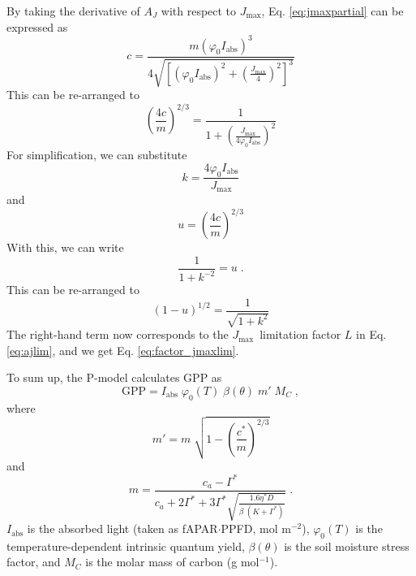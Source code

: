 \documentclass[gmd, manuscript]{copernicus}
\newcommand{\jmax}{$J_{\text{max}}$}
\begin{document}
By taking the derivative of $A_J$ with respect to \jmax , Eq. \ref{eq:jmaxpartial} can be expressed as
\begin{equation}
    c = \frac{ m (\varphi_0 I_\text{abs})^3}{ 4 \sqrt{ \left[ (\varphi_0 I_\text{abs})^2 + (\frac{J_\text{max}}{4})^2 \right]^3 }}
\end{equation}
This can be re-arranged to
\begin{equation}
    \left(\frac{4c}{m}\right)^{2/3} = \frac{1}{1 + \left( \frac{J_\text{max}}{4\varphi_0 I_\text{abs}}\right)^2}
\end{equation}
For simplification, we can substitute 
\begin{equation}
    k = \frac{4 \varphi_0 I_\text{abs}}{J_\text{max}}
\end{equation}
and 
\begin{equation}
    u = \left(\frac{4c}{m}\right)^{2/3}
\end{equation}
With this, we can write
\begin{equation}
    \frac{1}{1+k^{-2}} = u \;.
\end{equation}
This can be re-arranged to 
\begin{equation}
    (1-u)^{1/2} = \frac{1}{\sqrt{1+k^2}} 
\end{equation}
The right-hand term now corresponds to the \jmax\ limitation factor $L$ in Eq. \ref{eq:ajlim}, and we get Eq. \ref{eq:factor_jmaxlim}.

To sum up, the P-model calculates GPP as 
\begin{equation}
  \text{GPP} = I_\text{abs} \; \varphi_0(T) \; \beta(\theta) \; m' \; M_C \;,
\end{equation}
where
\begin{equation}
    m' = m \; \sqrt{1 - \left( \frac{c^\ast}{m} \right)^{2/3} }
\end{equation}
and 
\begin{equation}
    m = \frac{c_a - \Gamma^{\ast}}{c_a + 2 \Gamma^{\ast} + 3 \Gamma^{\ast} \sqrt{\frac{1.6 \eta^{\ast} D }{\beta\;(K+\Gamma^{\ast})}}} \;.
\end{equation}
$I_\text{abs}$ is the absorbed light (taken as fAPAR$\cdot$PPFD, mol m$^{-2}$), $\varphi_0(T)$ is the temperature-dependent intrinsic quantum yield, $\beta(\theta)$ is the soil moisture stress factor, and $M_C$ is the molar mass of carbon (g mol$^{-1}$).
\end{document}
